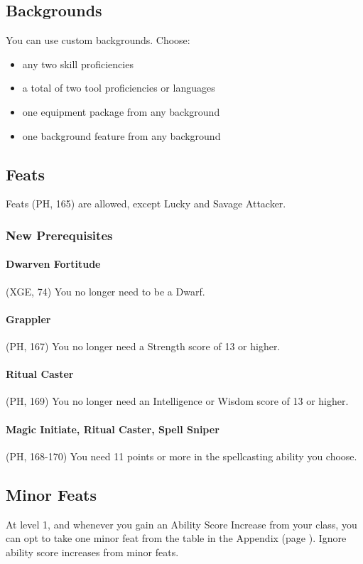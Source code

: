 \documentclass[letterpaper,twocolumn,openany,nodeprecatedcode,bg=print]{dndbook}
\newcommand{\pg}[1]{page \pageref{#1}}
\begin{document}
\subsection{Backgrounds}
You can use custom backgrounds. Choose:
\begin{itemize}
\item any two skill proficiencies 
\item a total of two tool proficiencies or languages 
\item one equipment package from any background
\item one background feature from any background
\end{itemize}

\subsection{Feats}
Feats (PH, 165) are allowed, except Lucky and Savage Attacker.

\subsubsection{New Prerequisites}

\paragraph{Dwarven Fortitude} (XGE, 74) 
You no longer need to be a Dwarf.

\paragraph{Grappler} (PH, 167) 
You no longer need a Strength score of 13 or higher.

\paragraph{Ritual Caster} (PH, 169) 
You no longer need an Intelligence or Wisdom score of 13 or higher.

\paragraph{Magic Initiate, Ritual Caster, Spell Sniper} (PH, 168-170) 
You need 11 points or more in the spellcasting ability you choose.

\subsection{Minor Feats}
\label{minor-feats}
At level 1, and whenever you gain an Ability Score Increase from your class, 
you can opt to take one minor feat from the table in the Appendix (\pg{minor-feats-table}). 
Ignore ability score increases from minor feats.
\end{document}

